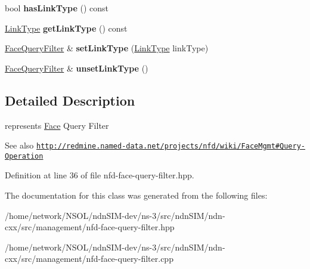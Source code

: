 \begin{DoxyCompactItemize}
\item 
bool {\bfseries has\+Link\+Type} () const\hypertarget{classndn_1_1nfd_1_1FaceQueryFilter_ae8e202967b73310beeea873d089710f8}{}\label{classndn_1_1nfd_1_1FaceQueryFilter_ae8e202967b73310beeea873d089710f8}

\item 
\hyperlink{group__management_gaa49a53cb4fe262ed33b001ccbe9c3502}{Link\+Type} {\bfseries get\+Link\+Type} () const\hypertarget{classndn_1_1nfd_1_1FaceQueryFilter_a4f8b2d3a78eddc58342a25289f78a2f8}{}\label{classndn_1_1nfd_1_1FaceQueryFilter_a4f8b2d3a78eddc58342a25289f78a2f8}

\item 
\hyperlink{classndn_1_1nfd_1_1FaceQueryFilter}{Face\+Query\+Filter} \& {\bfseries set\+Link\+Type} (\hyperlink{group__management_gaa49a53cb4fe262ed33b001ccbe9c3502}{Link\+Type} link\+Type)\hypertarget{classndn_1_1nfd_1_1FaceQueryFilter_ad2a15861d11fff8a30bdbf356e995137}{}\label{classndn_1_1nfd_1_1FaceQueryFilter_ad2a15861d11fff8a30bdbf356e995137}

\item 
\hyperlink{classndn_1_1nfd_1_1FaceQueryFilter}{Face\+Query\+Filter} \& {\bfseries unset\+Link\+Type} ()\hypertarget{classndn_1_1nfd_1_1FaceQueryFilter_a44804b6a27b75d1f854601cb8501577e}{}\label{classndn_1_1nfd_1_1FaceQueryFilter_a44804b6a27b75d1f854601cb8501577e}

\end{DoxyCompactItemize}


\subsection{Detailed Description}
represents \hyperlink{classndn_1_1Face}{Face} Query Filter 

\begin{DoxySeeAlso}{See also}
\href{http://redmine.named-data.net/projects/nfd/wiki/FaceMgmt#Query-Operation}{\tt http\+://redmine.\+named-\/data.\+net/projects/nfd/wiki/\+Face\+Mgmt\#\+Query-\/\+Operation} 
\end{DoxySeeAlso}


Definition at line 36 of file nfd-\/face-\/query-\/filter.\+hpp.



The documentation for this class was generated from the following files\+:\begin{DoxyCompactItemize}
\item 
/home/network/\+N\+S\+O\+L/ndn\+S\+I\+M-\/dev/ns-\/3/src/ndn\+S\+I\+M/ndn-\/cxx/src/management/nfd-\/face-\/query-\/filter.\+hpp\item 
/home/network/\+N\+S\+O\+L/ndn\+S\+I\+M-\/dev/ns-\/3/src/ndn\+S\+I\+M/ndn-\/cxx/src/management/nfd-\/face-\/query-\/filter.\+cpp\end{DoxyCompactItemize}
